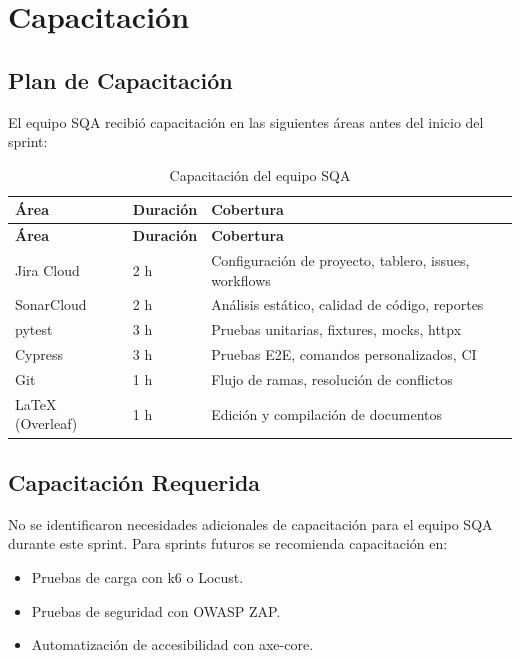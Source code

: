 \chapter{Capacitación}
\label{sec:capacitacion}

\section{Plan de Capacitación}
\label{sec:plan-capacitacion}

El equipo SQA recibió capacitación en las siguientes áreas antes del inicio del sprint:

\begin{longtable}{lp{4cm}p{6cm}}
\caption{Capacitación del equipo SQA}
\label{tab:capacitacion}\\
\toprule
\textbf{Área} & \textbf{Duración} & \textbf{Cobertura}\\
\midrule
\endfirsthead
\toprule
\textbf{Área} & \textbf{Duración} & \textbf{Cobertura}\\
\midrule
\endhead
\bottomrule
\endfoot

Jira Cloud & 2 h & Configuración de proyecto, tablero, issues, workflows\\

SonarCloud & 2 h & Análisis estático, calidad de código, reportes\\

pytest & 3 h & Pruebas unitarias, fixtures, mocks, httpx\\

Cypress & 3 h & Pruebas E2E, comandos personalizados, CI\\

Git & 1 h & Flujo de ramas, resolución de conflictos\\

LaTeX (Overleaf) & 1 h & Edición y compilación de documentos\\

\end{longtable}

\section{Capacitación Requerida}
\label{sec:capacitacion-requerida}

No se identificaron necesidades adicionales de capacitación para el equipo SQA durante este sprint. Para sprints futuros se recomienda capacitación en:

\begin{itemize}
    \item Pruebas de carga con k6 o Locust.
    \item Pruebas de seguridad con OWASP ZAP.
    \item Automatización de accesibilidad con axe-core.
\end{itemize}
